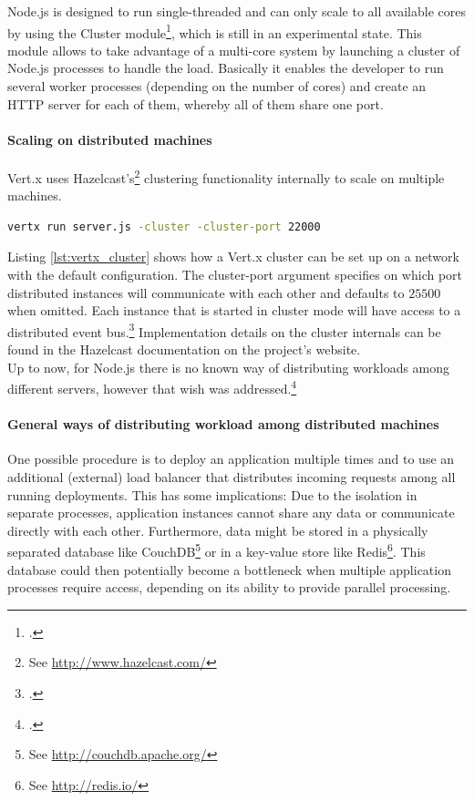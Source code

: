 Node.js is designed to run single-threaded and can only scale to all available
cores by using the Cluster module\footcite[Cf.][]{node_2012b}, which is still in an experimental state.
This module allows to take advantage of a multi-core system by launching a cluster of Node.js processes to handle the load. Basically it enables the developer to run several worker processes (depending on the number of cores) and create an HTTP server for each of them, whereby all of them share one port. 


\paragraph{Scaling on distributed machines}
Vert.x uses Hazelcast's\footnote{See \url{http://www.hazelcast.com/}} clustering
functionality internally to scale on multiple machines.\\

\begin{lstlisting}[language=bash,caption={Starting a Vert.x application in cluster mode},label={lst:vertx_cluster}]
vertx run server.js -cluster -cluster-port 22000
\end{lstlisting}

Listing \ref{lst:vertx_cluster} shows how a Vert.x cluster can be set up on a
network with the default configuration. The cluster-port argument specifies on
which port distributed instances will communicate with each other and defaults
to $25500$ when omitted.
Each instance that is started in cluster mode will have access to a distributed
event bus.\footcite[Cf.][]{vertx_2012} Implementation details on the cluster
internals can be found in the Hazelcast documentation on the project's
website.\\

Up to now, for Node.js there is no known way of distributing workloads among
different servers, however that wish was
addressed.\footcite[Cf.][]{node_clusterserver}


\paragraph{General ways of distributing workload among distributed machines}
One possible procedure is to deploy an application multiple times and to use an additional (external) load balancer that
distributes incoming requests among all running deployments. This has some
implications: Due to the isolation in separate processes, application instances cannot share any
data or communicate directly with each other.
Furthermore, data might be stored in a physically separated database like CouchDB\footnote{See
\url{http://couchdb.apache.org/}} or in a key-value store like Redis\footnote{See
\url{http://redis.io/}}. This database could then potentially become a bottleneck when multiple application
processes require access, depending on its ability to provide parallel processing.


